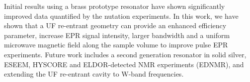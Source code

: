 Initial results using a brass prototype resonator have shown significantly improved data quantified by the nutation experiments. In this work, we have shown that a UF re-entrant geometry can provide an enhanced efficiency parameter, increase EPR signal intensity, larger bandwidth and a uniform microwave magnetic field along the sample volume to improve pulse EPR experiments. Future work includes a second generation resonator in solid silver, ESEEM, HYSCORE and ELDOR-detected NMR experiments (EDNMR), and extending the UF re-entrant \cylTE{} cavity to W-band frequencies.

{\renewcommand{\bibsection}{\clearpage\section*{\bibname}\markboth{\bibname}{\bibname}}
\renewcommand{\bibname}{CHAPTER 3. REFERENCES}

}